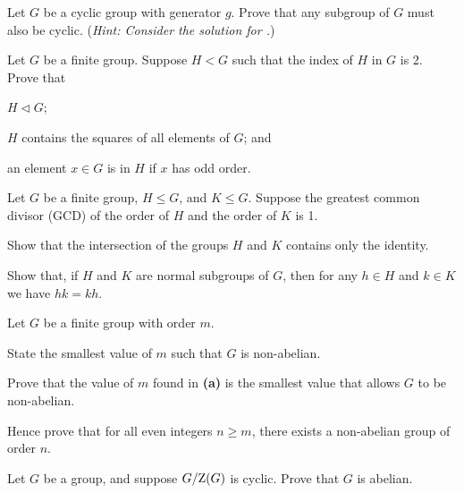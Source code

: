 \begin{problem}\label{problem-subgroup-of-cyclic-group-is-cyclic}
    Let $G$ be a cyclic group with generator $g$. Prove that any subgroup of $G$ must also be cyclic.\newline
    (\textit{Hint: Consider the solution for .})
\end{problem}

\begin{problem}\label{problem-subgroup-of-index-2}
    Let $G$ be a finite group. Suppose $H < G$ such that the index of $H$ in $G$ is 2. Prove that
    \begin{partquestions}{\roman*}
        \item $H \lhd G$;
        \item $H$ contains the squares of all elements of $G$; and
        \item an element $x \in G$ is in $H$ if $x$ has odd order.
    \end{partquestions}
\end{problem}

\begin{problem}\label{problem-intersection-of-coprime-subgroups}
    Let $G$ be a finite group, $H \leq G$, and $K \leq G$. Suppose the greatest common divisor (GCD) of the order of $H$ and the order of $K$ is 1.
    \begin{partquestions}{\alph*}
        \item Show that the intersection of the groups $H$ and $K$ contains only the identity.
        \item Show that, if $H$ and $K$ are normal subgroups of $G$, then for any $h \in H$ and $k \in K$ we have $hk = kh$.
    \end{partquestions}
\end{problem}

\begin{problem}\label{problem-smallest-nonabelian-group}
    Let $G$ be a finite group with order $m$.
    \begin{partquestions}{\alph*}
        \item State the smallest value of $m$ such that $G$ is non-abelian.
        \item Prove that the value of $m$ found in \textbf{(a)} is the smallest value that allows $G$ to be non-abelian.
        \item Hence prove that for all even integers $n \geq m$, there exists a non-abelian group of order $n$.
    \end{partquestions}
\end{problem}

\begin{problem}\label{problem-quotient-of-group-mod-center-is-cyclic-implies-abelian}
    Let $G$ be a group, and suppose $G / \mathrm{Z}(G)$ is cyclic. Prove that $G$ is abelian.
\end{problem}
